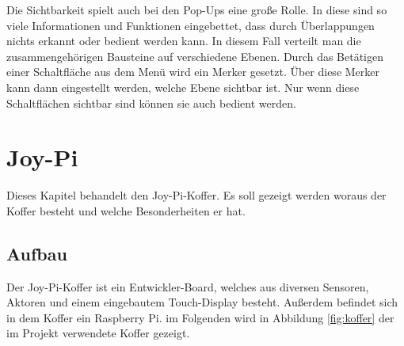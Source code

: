 Die Sichtbarkeit spielt auch bei den Pop-Ups eine große Rolle. In diese sind so viele Informationen und Funktionen eingebettet, dass durch Überlappungen nichts erkannt oder bedient werden kann. In diesem Fall verteilt man die zusammengehörigen Bausteine auf verschiedene Ebenen. Durch das Betätigen einer Schaltfläche aus dem Menü wird ein Merker gesetzt. Über diese Merker kann dann eingestellt werden, welche Ebene sichtbar ist. Nur wenn diese Schaltflächen sichtbar sind können sie auch bedient werden. 

\chapter{Joy-Pi}
Dieses Kapitel behandelt den Joy-Pi-Koffer. Es soll gezeigt werden woraus der Koffer besteht und welche Besonderheiten er hat.

\section{Aufbau}
Der Joy-Pi-Koffer ist ein Entwickler-Board, welches aus diversen Sensoren, Aktoren und einem eingebautem Touch-Display besteht. Außerdem befindet sich in dem Koffer ein Raspberry Pi. im Folgenden wird in Abbildung \ref{fig:koffer} der im Projekt verwendete Koffer gezeigt.
\begin{figure}[H] %
\end{figure} %
